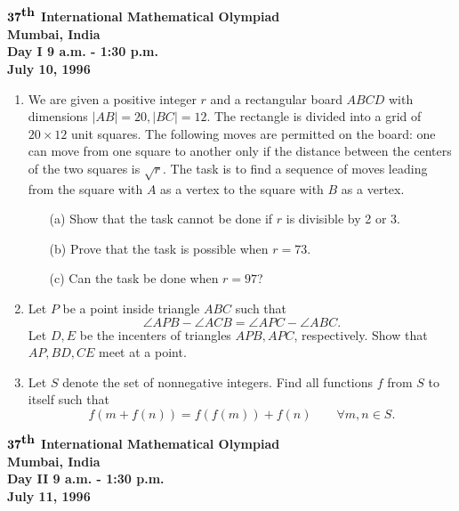 \documentclass[12pt]{article}
\begin{document}
\begin{center}
${\bf 37}^{\mbox{\bf th}}$ {\bf International
Mathematical Olympiad} \\[.1in]
{\bf Mumbai, India} \\ [.05in]
{\bf Day I \hspace{.25in} 9 a.m. - 1:30 p.m.}\\[.05in]
{\bf July 10, 1996}
\end{center}

\vspace*{.3in}

\begin{enumerate}
\item %
We are given a positive integer $r$ and a rectangular board $ABCD$ 
with dimensions $|AB| = 20, |BC| = 12$. The rectangle is divided into 
a grid of $20 \times 12$ unit squares. The following moves are 
permitted on the board: one can move from one square to another only 
if the distance between the centers of the two squares is $\sqrt{r}$. 
The task is to find a sequence of moves leading from the square 
with $A$ as a vertex to the square with $B$ as a vertex.
\begin{enumerate}
\item[(a)]
Show that the task cannot be done if $r$ is divisible by 2 or 3.
\item[(b)]
Prove that the task is possible when $r=73$.
\item[(c)]
Can the task be done when $r=97$?
\end{enumerate}

\item %
Let $P$ be a point inside triangle $ABC$ such that
\[
\angle APB - \angle ACB = \angle APC - \angle ABC.
\]
Let $D, E$ be the incenters of triangles $APB, APC$, respectively. Show 
that $AP, BD, CE$ meet at a point.

\item %
Let $S$ denote the set of nonnegative integers. Find all functions $f$ 
from $S$ to itself such that
\[
f(m + f(n)) = f(f(m)) + f(n) \qquad \forall m, n \in S.
\]

\end{enumerate}

\pagebreak %
\begin{center}
${\bf 37}^{\mbox{\bf th}}$ {\bf International
Mathematical Olympiad} \\[.1in]
{\bf Mumbai, India} \\ [.05in]
{\bf Day II \hspace{.25in} 9 a.m. - 1:30 p.m.}\\[.05in]
{\bf July 11, 1996}
\end{center}
\end{document}
